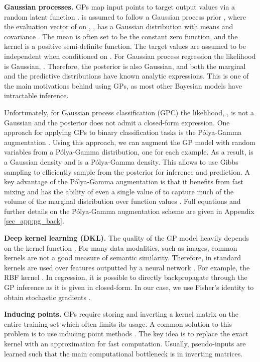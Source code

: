 \documentclass{article}
\newcommand{\pg}{P\'olya-Gamma }
\begin{document}
\textbf{Gaussian processes.}\label{sec:GPC}
GPs map input points to target output values  via a random latent function .  is assumed to follow a Gaussian process prior  , where the evaluation vector of  on ,  , has a Gaussian distribution  with means  and covariance . The mean  is often set to be the constant zero function, and the kernel  is a positive semi-definite function. The target values are assumed to be independent when conditioned on . For Gaussian process regression the likelihood is Gaussian, . Therefore, the posterior  is also Gaussian, and both the marginal and the predictive distributions have known analytic expressions. This is one of the main motivations behind using GPs, as most other Bayesian models have intractable inference.

Unfortunately, for Gaussian process classification (GPC) the likelihood, , is not a Gaussian and the posterior does not admit a closed-form expression. One approach for applying GPs to binary classification tasks is the \pg augmentation \cite{polya_gamma}. Using this approach, we can augment the GP model with random variables  from a \pg distribution, one for each example. As a result,  is a Gaussian density and  is a \pg density. This allows to use Gibbs sampling to efficiently sample from the posterior  for inference and prediction. A key advantage of the \pg augmentation is that it benefits from fast mixing and has the ability of even a single value of  to capture much of the volume of the marginal distribution over function values \cite{linderman2015dependent}. Full equations and further details on the \pg augmentation scheme are given in Appendix \ref{sec_app:pg_back}.

\textbf{Deep kernel learning (DKL).} 
The quality of the GP model heavily depends on the kernel function .
For many data modalities, such as images, common kernels are not a good measure of semantic similarity. Therefore, in \cite{calandra2016manifold, gordon16_DKL} standard kernels are used over features outputted by a neural network . For example, the RBF kernel . 
In regression, it is possible to directly backpropagate through the GP inference as it is given in closed-form. In our case, we use Fisher's identity \cite{douc2014nonlinear} to obtain stochastic gradients \cite{snell2020bayesian}.

\textbf{Inducing points.} GPs require storing and inverting a kernel matrix on the entire training set which often limits its usage. A common solution to this problem is to use inducing point methods \cite{quinonero2005unifying, sneldon_Gharamani_IP}. The key idea is to replace the exact kernel with an approximation for fast computation. Usually,  pseudo-inputs are learned such that the main computational bottleneck is in inverting  matrices. 
\end{document}
